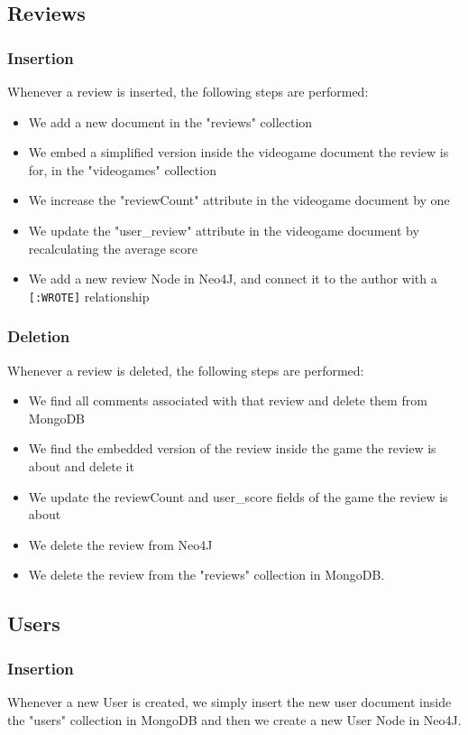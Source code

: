 \subsection{Reviews}
\subsubsection{Insertion}
Whenever a review is inserted, the following steps are performed:
\begin{itemize}
    \item We add a new document in the "reviews" collection
    \item  We embed a simplified version inside the videogame document the review is for, in the "videogames" collection
    \item We increase the "reviewCount" attribute in the videogame document by one
    \item We update the "user\_review" attribute in the videogame document by recalculating the average score
    \item We add a new review Node in Neo4J, and connect it to the author with a \texttt{[:WROTE]} relationship
\end{itemize}
\subsubsection{Deletion}
Whenever a review is deleted, the following steps are performed:
\begin{itemize}
    \item We find all comments associated with that review and delete them from MongoDB
    \item We find the embedded version of the review inside the game the review is about and delete it
    \item We update the reviewCount and user\_score fields of the game the review is about
    \item We delete the review from Neo4J
    \item We delete the review from the "reviews" collection in MongoDB.
\end{itemize}
\subsection{Users}
\subsubsection{Insertion}
Whenever a new User is created, we simply insert the new user document inside the "users" collection in MongoDB and then we create a new User Node in Neo4J.
